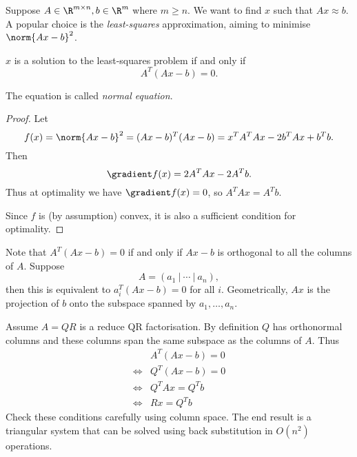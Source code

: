 \documentclass[a4paper]{article}
\begin{document}
Suppose \(A \in \R^{m \times n}, b \in \R^m\) where \(m \geq n\). We want to find \(x\) such that \(Ax \approx b\). A popular choice is the \emph{least-squares} approximation, aiming to minimise \(\norm{Ax - b}^2\).

\begin{theorem}
  \(x\) is a solution to the least-squares problem if and only if
  \[
    A^T(Ax - b) = 0.
  \]
\end{theorem}

The equation is called \emph{normal equation}.

\begin{proof}
  Let
  \[
    f(x) = \norm{Ax - b}^2 = (Ax - b)^T(Ax - b) = x^TA^TAx - 2b^TAx + b^Tb.
  \]
  Then
  \[
    \gradient f(x) = 2A^TAx - 2A^Tb.
  \]
  Thus at optimality we have \(\gradient f(x) = 0\), so \(A^TAx = A^Tb\).

  Since \(f\) is (by assumption) convex, it is also a sufficient condition for optimality.
\end{proof}

Note that \(A^T(Ax - b) = 0\) if and only if \(Ax - b\) is orthogonal to all the columns of \(A\). Suppose
\[
  A = (a_1 \ | \ \cdots \ | \ a_n),
\]
then this is equivalent to \(a_i^T(Ax - b) = 0\) for all \(i\). Geometrically, \(Ax\) is the projection of \(b\) onto the subspace spanned by \(a_1, \dots, a_n\).

Assume \(A = QR\) is a reduce QR factorisation. By definition \(Q\) has orthonormal columns and these columns span the same subspace as the columns of \(A\). Thus
\begin{align*}
  & A^T(Ax - b) = 0 \\
  \iff & Q^T(Ax - b) = 0 \\
  \iff & Q^TAx = Q^Tb \\
  \iff & Rx = Q^Tb
\end{align*}
Check these conditions carefully using column space. The end result is a triangular system that can be solved using back substitution in \(O(n^2)\) operations.

\printindex

\iffalse
http://damtp.cam.ac.uk/user/hf323/L18-IB-NA/
\fi
\end{document}
